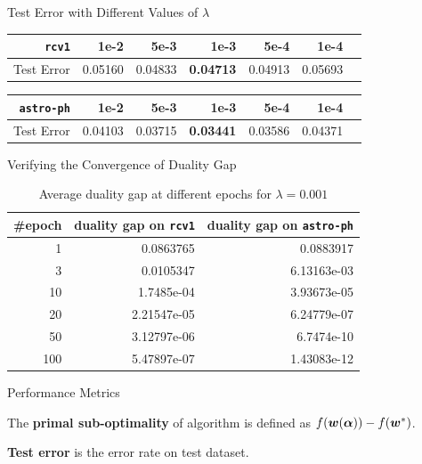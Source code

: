 \begin{frame}{Test Error with Different Values of $\lambda$}
\begin{table}[htbp]
    \centering
    \begin{tabular}{|r|r|r|r|r|r|r|}
        \hline
        \texttt{rcv1} & 1e-2 & 5e-3 & \textbf{1e-3} & 5e-4 & 1e-4\\
        \hline
        Test Error & 0.05160 & 0.04833 & \textbf{0.04713} & 0.04913 & 0.05693 \\
        \hline
    \end{tabular}
\end{table}
\begin{table}[htbp]
    \begin{tabular}{|r|r|r|r|r|r|r|}
        \hline
         \texttt{astro-ph} & 1e-2 & 5e-3 & \textbf{1e-3} & 5e-4 & 1e-4 \\
        \hline
        Test Error & 0.04103 & 0.03715 & \textbf{0.03441} & 0.03586 & 0.04371 \\
        \hline
    \end{tabular}
\end{table}
\end{frame}

\begin{frame}{Verifying the Convergence of Duality Gap}
\begin{table}[htbp]
    \centering
    \caption{Average duality gap at different epochs for $\lambda = 0.001$} 
    \label{table:covdual1}
    \begin{tabular}{|r|r|r|}
        \hline
        \#epoch & duality gap on \texttt{rcv1} & duality gap on \texttt{astro-ph} \\ 
        \hline
        1 & 0.0863765 & 0.0883917\\
        3 & 0.0105347 & 6.13163e-03 \\
        10 & 1.7485e-04 & 3.93673e-05 \\
        20 & 2.21547e-05 & 6.24779e-07 \\
        50 & 3.12797e-06 & 6.7474e-10\\
        100 & 5.47897e-07 & 1.43083e-12 \\
        \hline
    \end{tabular}
\end{table}
\end{frame}

\begin{frame}{Performance Metrics}
\begin{definition}\label{def:psds}
The \textbf{primal sub-optimality} of algorithm is defined as $f(\bm{w}(\bm{\alpha})) - f(\bm{w}^*)$. 
\end{definition}
\begin{definition}
\textbf{Test error} is the error rate on test dataset.
\end{definition}
\end{frame}

